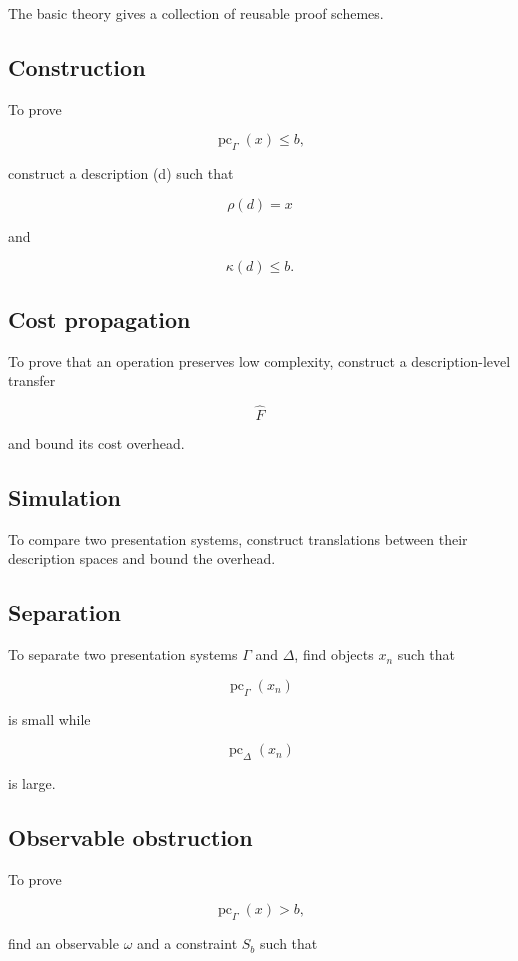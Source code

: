 \documentclass[11pt]{article}
\begin{document}
The basic theory gives a collection of reusable proof schemes.


\subsection*{Construction}

To prove

\[
\operatorname{pc}_\Gamma(x)\leq b,
\]

construct a description (d) such that

\[
\rho(d)=x
\]

and

\[
\kappa(d)\leq b.
\]


\subsection*{Cost propagation}

To prove that an operation preserves low complexity, construct a description-level transfer

\[
\widehat F
\]

and bound its cost overhead.


\subsection*{Simulation}

To compare two presentation systems, construct translations between their description spaces and bound the overhead.


\subsection*{Separation}

To separate two presentation systems \(\Gamma\) and \(\Delta\), find objects \(x_n\) such that

\[
\operatorname{pc}_\Gamma(x_n)
\]

is small while

\[
\operatorname{pc}_\Delta(x_n)
\]

is large.


\subsection*{Observable obstruction}

To prove

\[
\operatorname{pc}_\Gamma(x)> b,
\]

find an observable \(\omega\) and a constraint \(S_b\) such that
\end{document}

